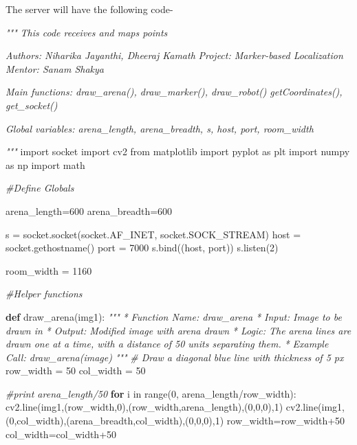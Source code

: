 \documentclass[]{article}
\newenvironment{Shaded}{}{}
\newcommand{\KeywordTok}[1]{\textcolor[rgb]{0.00,0.44,0.13}{\textbf{{#1}}}}
\newcommand{\DecValTok}[1]{\textcolor[rgb]{0.25,0.63,0.44}{{#1}}}
\newcommand{\ImportTok}[1]{{#1}}
\newcommand{\CommentTok}[1]{\textcolor[rgb]{0.38,0.63,0.69}{\textit{{#1}}}}
\newcommand{\ControlFlowTok}[1]{\textcolor[rgb]{0.00,0.44,0.13}{\textbf{{#1}}}}
\newcommand{\OperatorTok}[1]{\textcolor[rgb]{0.40,0.40,0.40}{{#1}}}
\newcommand{\BuiltInTok}[1]{{#1}}
\newcommand{\NormalTok}[1]{{#1}}
\begin{document}
The server will have the following code-

\begin{Shaded}
\begin{Highlighting}[]
\CommentTok{"""}
\CommentTok{This code receives and maps points}

\CommentTok{Authors: Niharika Jayanthi, Dheeraj Kamath}
\CommentTok{Project: Marker-based Localization}
\CommentTok{Mentor: Sanam Shakya}

\CommentTok{Main functions: draw_arena(), draw_marker(), draw_robot()}
\CommentTok{                getCoordinates(), get_socket()}

\CommentTok{Global variables: arena_length, arena_breadth, s, host, port, room_width}

\CommentTok{"""}
\ImportTok{import} \NormalTok{socket}
\ImportTok{import} \NormalTok{cv2}
\ImportTok{from} \NormalTok{matplotlib }\ImportTok{import} \NormalTok{pyplot }\ImportTok{as} \NormalTok{plt}
\ImportTok{import} \NormalTok{numpy }\ImportTok{as} \NormalTok{np}
\ImportTok{import} \NormalTok{math}


\CommentTok{#Define Globals}

\NormalTok{arena_length}\OperatorTok{=}\DecValTok{600}
\NormalTok{arena_breadth}\OperatorTok{=}\DecValTok{600}

\NormalTok{s }\OperatorTok{=} \NormalTok{socket.socket(socket.AF_INET, socket.SOCK_STREAM)}
\NormalTok{host }\OperatorTok{=} \NormalTok{socket.gethostname()}
\NormalTok{port }\OperatorTok{=} \DecValTok{7000}
\NormalTok{s.bind((host, port))}
\NormalTok{s.listen(}\DecValTok{2}\NormalTok{)}

\NormalTok{room_width }\OperatorTok{=} \DecValTok{1160}


\CommentTok{#Helper functions}

\KeywordTok{def} \NormalTok{draw_arena(img1):}
    \CommentTok{"""}
\CommentTok{    * Function Name:    draw_arena}
\CommentTok{    * Input:        Image to be drawn in}
\CommentTok{    * Output:       Modified image with arena drawn}
\CommentTok{    * Logic:        The arena lines are drawn one at a time, with a distance}
\CommentTok{                        of 50 units separating them.}
\CommentTok{    * Example Call: draw_arena(image)}
\CommentTok{    """}
    \CommentTok{# Draw a diagonal blue line with thickness of 5 px}
    \NormalTok{row_width }\OperatorTok{=} \DecValTok{50}
    \NormalTok{col_width }\OperatorTok{=}  \DecValTok{50}

    \CommentTok{#print arena_length/50}
    \ControlFlowTok{for} \NormalTok{i }\OperatorTok{in} \BuiltInTok{range}\NormalTok{(}\DecValTok{0}\NormalTok{, arena_length}\OperatorTok{/}\NormalTok{row_width):}
        \NormalTok{cv2.line(img1,(row_width,}\DecValTok{0}\NormalTok{),(row_width,arena_length),(}\DecValTok{0}\NormalTok{,}\DecValTok{0}\NormalTok{,}\DecValTok{0}\NormalTok{),}\DecValTok{1}\NormalTok{)}
        \NormalTok{cv2.line(img1,(}\DecValTok{0}\NormalTok{,col_width),(arena_breadth,col_width),(}\DecValTok{0}\NormalTok{,}\DecValTok{0}\NormalTok{,}\DecValTok{0}\NormalTok{),}\DecValTok{1}\NormalTok{)}
        \NormalTok{row_width}\OperatorTok{=}\NormalTok{row_width}\DecValTok{+50}
        \NormalTok{col_width}\OperatorTok{=}\NormalTok{col_width}\DecValTok{+50}
    

\end{Highlighting}
\end{Shaded}
\end{document}
